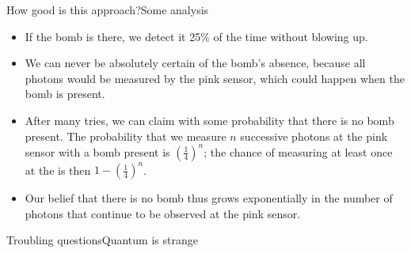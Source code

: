 \begin{frame}{How good is this approach?}{Some analysis}

\begin{itemize}
    \item If the bomb is there, we detect it 25\% of the time without blowing up.
    \item We can never be absolutely certain of the bomb's absence, because all photons would be measured by the \textcolor{\RCone}{pink sensor}, which could happen when the bomb is present.
    \item After many tries, we can claim with some probability that there is no bomb present.  The probability that we measure $n$ successive photons at the \textcolor{\RCone}{pink sensor} with a bomb present is $\left(\frac{1}{4}\right)^{n}$;  the chance of measuring at least once at the  is then $1-{(\frac{1}{4})}^{n}$.
    \item Our belief that there is no bomb thus grows exponentially in the number of photons that continue to be observed at the \textcolor{\RCone}{pink sensor}.
\end{itemize}
    
\end{frame}

\begin{frame}{Troubling questions}{Quantum is strange}
\end{frame}


